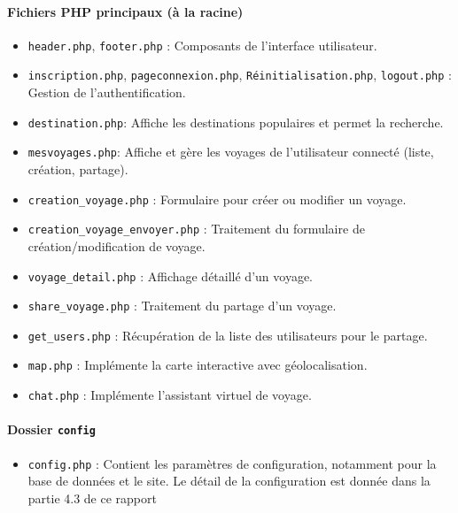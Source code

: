 \documentclass[a4paper,12pt]{article}
\begin{document}
\paragraph{Fichiers PHP principaux (à la racine)}
\begin{itemize}
     \item \texttt{header.php}, \texttt{footer.php} : Composants de l'interface utilisateur.
    \item \texttt{inscription.php}, \texttt{pageconnexion.php}, \texttt{Réinitialisation.php}, \texttt{logout.php} : Gestion de l'authentification.
    \item \texttt{destination.php}: Affiche les destinations populaires et permet la recherche.
     \item \texttt{mesvoyages.php}: Affiche et gère les voyages de l'utilisateur connecté (liste, création, partage).
     \item \texttt{creation\_voyage.php} : Formulaire pour créer ou modifier un voyage.
     \item \texttt{creation\_voyage\_envoyer.php} : Traitement du formulaire de création/modification de voyage.
     \item \texttt{voyage\_detail.php} : Affichage détaillé d'un voyage.
     \item \texttt{share\_voyage.php} : Traitement du partage d'un voyage.
     \item \texttt{get\_users.php} : Récupération de la liste des utilisateurs pour le partage.
     \item \texttt{map.php} : Implémente la carte interactive avec géolocalisation.
    \item \texttt{chat.php} : Implémente l'assistant virtuel de voyage.
\end{itemize}

\paragraph{Dossier \texttt{config}}
\begin{itemize}
    \item \texttt{config.php} : Contient les paramètres de configuration, notamment pour la base de données et le site. Le détail de la configuration est donnée dans la partie 4.3 de ce rapport
\end{itemize}
\end{document}
